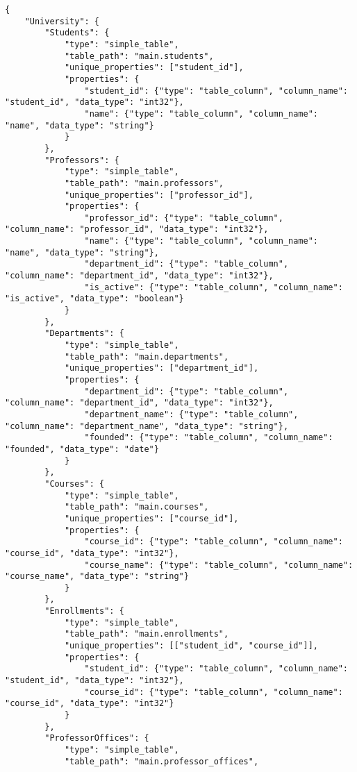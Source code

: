 \documentclass{article}
\begin{document}
\begin{verbatim}
{
    "University": {
        "Students": {
            "type": "simple_table",
            "table_path": "main.students",
            "unique_properties": ["student_id"],
            "properties": {
                "student_id": {"type": "table_column", "column_name": "student_id", "data_type": "int32"},
                "name": {"type": "table_column", "column_name": "name", "data_type": "string"}
            }
        },
        "Professors": {
            "type": "simple_table",
            "table_path": "main.professors",
            "unique_properties": ["professor_id"],
            "properties": {
                "professor_id": {"type": "table_column", "column_name": "professor_id", "data_type": "int32"},
                "name": {"type": "table_column", "column_name": "name", "data_type": "string"},
                "department_id": {"type": "table_column", "column_name": "department_id", "data_type": "int32"},
                "is_active": {"type": "table_column", "column_name": "is_active", "data_type": "boolean"}
            }
        },
        "Departments": {
            "type": "simple_table",
            "table_path": "main.departments",
            "unique_properties": ["department_id"],
            "properties": {
                "department_id": {"type": "table_column", "column_name": "department_id", "data_type": "int32"},
                "department_name": {"type": "table_column", "column_name": "department_name", "data_type": "string"},
                "founded": {"type": "table_column", "column_name": "founded", "data_type": "date"}
            }
        },
        "Courses": {
            "type": "simple_table",
            "table_path": "main.courses",
            "unique_properties": ["course_id"],
            "properties": {
                "course_id": {"type": "table_column", "column_name": "course_id", "data_type": "int32"},
                "course_name": {"type": "table_column", "column_name": "course_name", "data_type": "string"}
            }
        },
        "Enrollments": {
            "type": "simple_table",
            "table_path": "main.enrollments",
            "unique_properties": [["student_id", "course_id"]],
            "properties": {
                "student_id": {"type": "table_column", "column_name": "student_id", "data_type": "int32"},
                "course_id": {"type": "table_column", "column_name": "course_id", "data_type": "int32"}
            }
        },
        "ProfessorOffices": {
            "type": "simple_table",
            "table_path": "main.professor_offices",

\end{verbatim}
\end{document}
